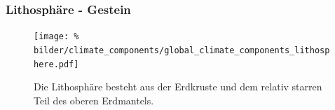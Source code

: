 \begin{frame}
	\frametitle{Lithosphäre - Gestein}

	\begin{figure}
		\centering
		\texttt{[image: \%
        bilder/climate\_components/global\_climate\_components\_lithosphere.pdf]}
		\caption{Die Lithosphäre besteht aus der Erdkruste und dem relativ starren Teil des oberen Erdmantels.}
	\end{figure}

\end{frame}
